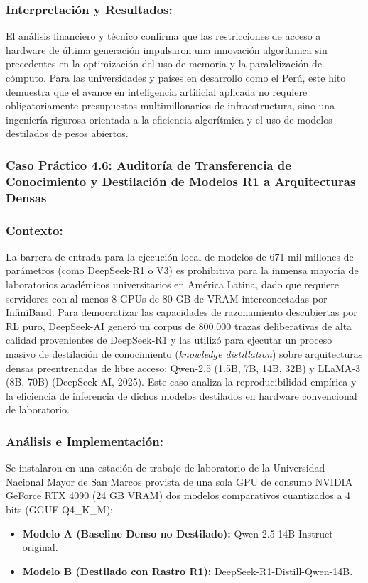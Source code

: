 \subsubsection*{Interpretación y Resultados:}
El análisis financiero y técnico confirma que las restricciones de acceso a hardware de última generación impulsaron una innovación algorítmica sin precedentes en la optimización del uso de memoria y la paralelización de cómputo. Para las universidades y países en desarrollo como el Perú, este hito demuestra que el avance en inteligencia artificial aplicada no requiere obligatoriamente presupuestos multimillonarios de infraestructura, sino una ingeniería rigurosa orientada a la eficiencia algorítmica y el uso de modelos destilados de pesos abiertos.


\subsubsection{Caso Práctico 4.6: Auditoría de Transferencia de Conocimiento y Destilación de Modelos R1 a Arquitecturas Densas}

\subsubsection*{Contexto:}
La barrera de entrada para la ejecución local de modelos de 671 mil millones de parámetros (como DeepSeek-R1 o V3) es prohibitiva para la inmensa mayoría de laboratorios académicos universitarios en América Latina, dado que requiere servidores con al menos 8 GPUs de 80 GB de VRAM interconectadas por InfiniBand. Para democratizar las capacidades de razonamiento descubiertas por RL puro, DeepSeek-AI generó un corpus de 800.000 trazas deliberativas de alta calidad provenientes de DeepSeek-R1 y las utilizó para ejecutar un proceso masivo de destilación de conocimiento (\textit{knowledge distillation}) sobre arquitecturas densas preentrenadas de libre acceso: Qwen-2.5 (1.5B, 7B, 14B, 32B) y LLaMA-3 (8B, 70B) (DeepSeek-AI, 2025). Este caso analiza la reproducibilidad empírica y la eficiencia de inferencia de dichos modelos destilados en hardware convencional de laboratorio.

\subsubsection*{Análisis e Implementación:}
Se instalaron en una estación de trabajo de laboratorio de la Universidad Nacional Mayor de San Marcos provista de una sola GPU de consumo NVIDIA GeForce RTX 4090 (24 GB VRAM) dos modelos comparativos cuantizados a 4 bits (GGUF Q4\_K\_M):
\begin{itemize}
    \item \textbf{Modelo A (Baseline Denso no Destilado):} Qwen-2.5-14B-Instruct original.
    \item \textbf{Modelo B (Destilado con Rastro R1):} DeepSeek-R1-Distill-Qwen-14B.
\end{itemize}

